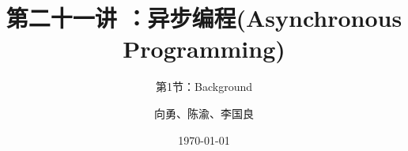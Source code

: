 


\title[第21讲]{第二十一讲 ：异步编程(Asynchronous Programming)} %
\subtitle{第1节：Background}
\author{向勇、陈渝、李国良} %
\date{\today} %



\begin{frame}
\titlepage %
\end{frame}

